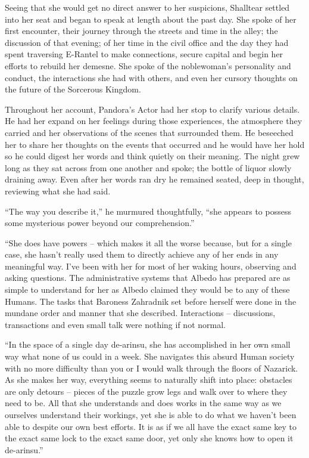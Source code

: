  

Seeing that she would get no direct answer to her suspicions, Shalltear settled into her seat and began to speak at length about the past day. She spoke of her first encounter, their journey through the streets and time in the alley; the discussion of that evening; of her time in the civil office and the day they had spent traversing E-Rantel to make connections, secure capital and begin her efforts to rebuild her demesne. She spoke of the noblewoman’s personality and conduct, the interactions she had with others, and even her cursory thoughts on the future of the Sorcerous Kingdom.

 

Throughout her account, Pandora’s Actor had her stop to clarify various details. He had her expand on her feelings during those experiences, the atmosphere they carried and her observations of the scenes that surrounded them. He beseeched her to share her thoughts on the events that occurred and he would have her hold so he could digest her words and think quietly on their meaning. The night grew long as they sat across from one another and spoke; the bottle of liquor slowly draining away. Even after her words ran dry he remained seated, deep in thought, reviewing what she had said.

 

“The way you describe it,” he murmured thoughtfully, “she appears to possess some mysterious power beyond our comprehension.”

 

“She does have powers – which makes it all the worse because, but for a single case, she hasn’t really used them to directly achieve any of her ends in any meaningful way. I’ve been with her for most of her waking hours, observing and asking questions. The administrative systems that Albedo has prepared are as simple to understand for her as Albedo claimed they would be to any of these Humans. The tasks that Baroness Zahradnik set before herself were done in the mundane order and manner that she described. Interactions – discussions, transactions and even small talk were nothing if not normal.

 

“In the space of a single day de-arinsu, she has accomplished in her own small way what none of us could in a week. She navigates this absurd Human society with no more difficulty than you or I would walk through the floors of Nazarick. As she makes her way, everything seems to naturally shift into place: obstacles are only detours – pieces of the puzzle grow legs and walk over to where they need to be. All that she understands and does works in the same way as we ourselves understand their workings, yet she is able to do what we haven’t been able to despite our own best efforts. It is as if we all have the exact same key to the exact same lock to the exact same door, yet only she knows how to open it de-arinsu.”

